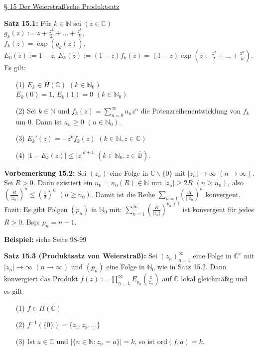 \documentclass[11pt]{article}
\newcommand{\C}{\mathbb{C}}
\newcommand{\N}{\mathbb{N}}
\newcommand{\D}{\mathbb{D}}
\begin{document}
\underline{§ 15 Der Weierstraß'sche Produktsatz}

\textbf{Satz 15.1:} Für $k \in \N$ sei $(z \in \C)$ \\
$g_k(z) := z + \frac{z^2}{2} + \dots + \frac{z^k}{k}$, \\
$f_k(z) = \exp(g_k(z))$, \\
$E_0(z) := 1-z$, $E_k(z) := (1-z)f_k(z) = (1-z) \exp (z + \frac{z^2}{2} + \dots + \frac{z^k}{k})$. Es gilt:
\vspace{-0.6cm}
\begin{itemize}
\item[(1)] $E_k \in H(\C)$ $(k \in \N_0)$ \\
$E_k(0) = 1$, $E_k(1) = 0$ $(k \in \N_0)$ \vspace{-0.2cm}
\item[(2)] Sei $k \in \N$ und $f_k(z) = \sum_{n=0}^\infty a_n z^n$ die Potenzreihenentwicklung von $f_k$ um $0$. Dann ist $a_n \geq 0$ $(n \in \N_0)$. \vspace{-0.2cm}
\item[(3)] $E_k'(z) = -z^kf_k(z)$ $(k \in \N, z \in \C)$ \vspace{-0.2cm}
\item[(4)] $|1-E_k(z)| \leq |z|^{k+1}$ $(k \in \N_0, z \in \overline{\D})$.
\end{itemize}
\vspace{-0.3cm}

\textbf{Vorbemerkung 15.2:} Sei $(z_n)$ eine Folge in $\C \backslash \{ 0 \}$ mit $|z_n| \to \infty$ $(n \to \infty)$. Sei $R > 0$. Dann existiert ein $n_0 = n_0(R) \in \N$ mit $|z_n| \geq 2R$ $(n \geq n_0)$, also $(\frac{R}{|z_n|})^n \leq (\frac{1}{2})^n$ $(n \geq n_0)$. Damit ist die Reihe $\sum_{n=1} (\frac{R}{||z_n})^n$ konvergent. \\
Fazit: Es gibt Folgen $(p_n)$ in $\N_0$ mit: $\sum_{n=1}^\infty (\frac{R}{|z_n|})^{p_n + 1}$ ist konvergent für jedes $R > 0$. Bsp: $p_n = n-1$.

\textbf{Beispiel:} siehe Seite 98-99

\textbf{Satz 15.3 (Produktsatz von Weierstraß):} Sei $(z_n)_{n = 1}^\infty$ eine Folge in $\C^x$ mit $|z_n| \to \infty$ $(n \to \infty)$ und $(p_n)$ eine Folge in $\N_0$ wie in Satz 15.2. Dann konvergiert das Produkt $f(z) := \prod_{n=1}^\infty E_{p_n} ( \frac{z}{z_n} )$ auf $\C$ lokal gleichmäßig und es gilt:
\vspace{-0.6cm}
\begin{itemize}
\item[(1)] $f \in H(\C)$ \vspace{-0.2cm}
\item[(2)] $f^{-1}(\{ 0 \}) = \{ z_1, z_2, \dots \}$ \vspace{-0.2cm}
\item[(3)] Ist $a \in \C$ und $|\{ n \in \N\colon z_n = a \}| = k$, so ist ord$(f,a) = k$.
\end{itemize}
\vspace{-0.3cm}
\end{document}
